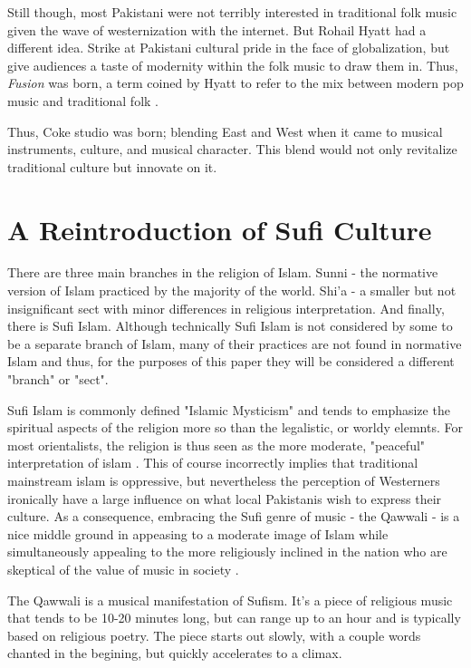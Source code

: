 \documentclass{article}
\begin{document}
  Still though, most Pakistani were not terribly interested in traditional folk 
  music given the wave of westernization with the internet. But Rohail Hyatt had a 
  different idea. Strike at Pakistani cultural pride in the face of globalization, but 
  give audiences a taste of modernity within the folk music to draw them in. Thus, 
  \textit{Fusion} was born, a term coined by Hyatt to refer to the mix between modern pop music
  and traditional folk \autocite{dhanwani2014coke}.

  Thus, Coke studio was born; blending East and West when it came to musical
  instruments, culture, and musical character. This blend would not only
  revitalize traditional culture but innovate on it. 

  \section{A Reintroduction of Sufi Culture}

  There are three main branches in the religion of Islam. Sunni - the normative
  version of Islam practiced by the majority of the world. Shi'a - a smaller but
  not insignificant sect with minor differences in religious interpretation. And
  finally, there is Sufi Islam. Although technically Sufi Islam is not
  considered by some to be a separate branch of Islam, many of their practices
  are not found in normative Islam and thus, for the purposes of this paper they
  will be considered a different "branch" or "sect". 

  Sufi Islam is commonly defined "Islamic Mysticism" and tends to emphasize the 
  spiritual aspects of the religion more so than the legalistic, or worldy
  elemnts. For most orientalists, the religion is thus seen as the more 
  moderate, "peaceful" interpretation of islam \autocite{beg2020fizzy}. This of
  course incorrectly implies that traditional mainstream islam is oppressive,
  but nevertheless the perception of Westerners ironically have a large
  influence on what local Pakistanis wish to express their culture. As a
  consequence, embracing the Sufi genre of music - the Qawwali - is a nice
  middle ground in appeasing to a moderate image of Islam while simultaneously 
  appealing to the more religiously inclined in the nation who are skeptical of
  the value of music in society \autocite{beg2020fizzy}.

  The Qawwali is a musical manifestation of Sufism. It's a piece of religious music 
  that tends to be 10-20 minutes long, but can range up to an hour and is typically 
  based on religious poetry. The piece starts out slowly, with a couple words chanted
  in the begining, but quickly accelerates to a climax. 
\end{document}
